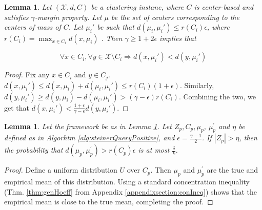 \documentclass{article}
\newcommand{\mc}{\mathcal}
\newtheorem{lemma}[theorem]{Lemma}
\begin{document}
\begin{lemma}
\label{lemma:hasGammaMargin}
Let $(\mc X, d, C)$ be a clustering instane, where $C$ is center-based and satisfies $\gamma$-margin property. Let $\mu$ be the set of centers corresponding to the centers of mass of $C$. Let $\mu_i'$ be such that $d(\mu_i, \mu_i') \le r(C_i)\epsilon$, where $r(C_i) = \max_{x\in C_i}d(x, \mu_i)$ . Then $\gamma \ge 1 + 2\epsilon$ implies that 

$$\forall x \in C_i, \forall y \in {\mc X} \setminus C_i \Rightarrow d(x, \mu_i') < d(y, \mu_i')$$  
\end{lemma}


\begin{proof}
Fix any $x \in C_i$ and $y \in C_j$. $d(x, \mu_i') \le d(x, \mu_i)+d(\mu_i, \mu_i') \le r(C_i) (1+\epsilon)$. Similarly, $d(y, \mu_i') \ge d(y, \mu_i) - d(\mu_i, \mu_i') > (\gamma -\epsilon)r(C_i)$. Combining the two, we get that $d(x, \mu_i') < \frac{1+\epsilon}{\gamma-\epsilon}d(y, \mu_i')$. 
\end{proof}

\begin{lemma}
\label{lemma:phase1}
Let the framework be as in Lemma \ref{lemma:hasGammaMargin}. Let $Z_p, C_p, \mu_p$, $\mu_p^\prime$ and $\eta$ be defined as in Algorhtm \ref{alg:steinerQueryPositive}, and $\epsilon = \frac{\gamma - 1}{2}$. If $|Z_p| > \eta$, then the probability that $d(\mu_p, \mu_p^\prime) > r(C_p)\epsilon$ is at most $\frac{\delta}{k}$.
\end{lemma}
\begin{proof}
Define a uniform distribution $U$ over $C_p$. Then $\mu_p$ and $\mu_p^\prime$ are the true and empirical mean of this distribution. Using a standard concentration inequality (Thm. \ref{thm:genHoeff} from Appendix \ref{appendixsection:conIneq}) shows that the empirical mean is close to the true mean, completing the proof.

\end{proof}
\end{document}
